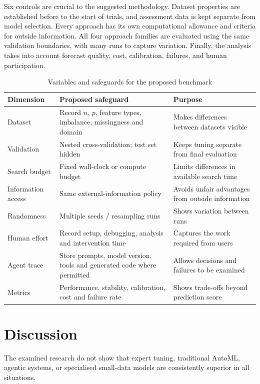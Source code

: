 \documentclass[acmsmall,screen]{acmart}
\begin{document}
Six controls are crucial to the suggested methodology. Dataset properties are established before to the start of trials, and assessment data is kept separate from model selection. Every approach has its own computational allowance and criteria for outside information. All four approach families are evaluated using the same validation boundaries, with many runs to capture variation. Finally, the analysis takes into account forecast quality, cost, calibration, failures, and human participation.

\begin{table}[!ht]
\caption{Variables and safeguards for the proposed benchmark}
\label{tab:protocol}
\centering
\small
\begin{tabularx}{\textwidth}{@{}p{}p{}X@{}}
\toprule
Dimension & Proposed safeguard & Purpose\\
\midrule
Dataset & Record $n$, $p$, feature types, imbalance, missingness and domain & Makes differences between datasets visible\\
Validation & Nested cross-validation; test set hidden & Keeps tuning separate from final evaluation\\
Search budget & Fixed wall-clock or compute budget & Limits differences in available search time\\
Information access & Same external-information policy & Avoids unfair advantages from outside information\\
Randomness & Multiple seeds / resampling runs & Shows variation between runs\\
Human effort & Record setup, debugging, analysis and intervention time & Captures the work required from users\\
Agent trace & Store prompts, model version, tools and generated code where permitted & Allows decisions and failures to be examined\\
Metrics & Performance, stability, calibration, cost and failure rate & Shows trade-offs beyond prediction score\\
\bottomrule
\end{tabularx}
\end{table}

\section{Discussion}\label{sec:discussion}

The examined research do not show that expert tuning, traditional AutoML, agentic systems, or specialised small-data models are consistently superior in all situations.
\end{document}
